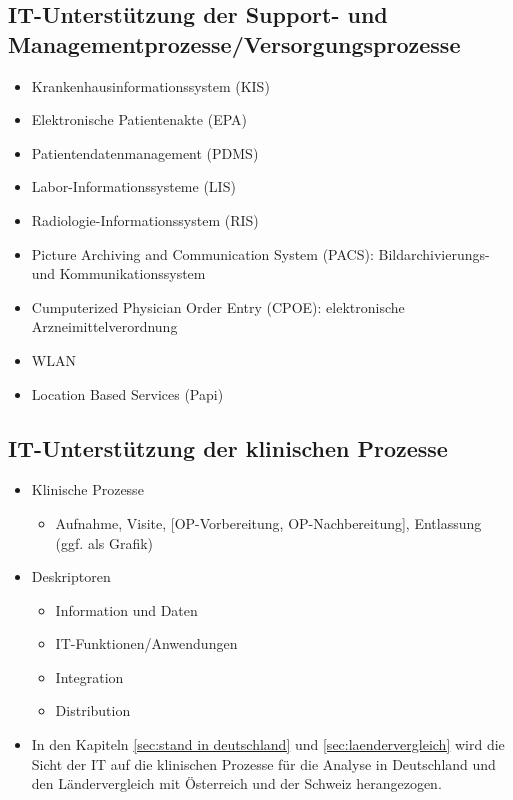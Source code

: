 	\subsection{IT-Unterstützung der Support- und Managementprozesse/Versorgungsprozesse}
	\parencite{oswald2019} \parencite[14]{braeutigam2017}
	\begin{itemize}
		\item Krankenhausinformationssystem (KIS)
		\item Elektronische Patientenakte (EPA)
		\item Patientendatenmanagement (PDMS)
		\item Labor-Informationssysteme (LIS)
		\item Radiologie-Informationssystem (RIS)
		\item Picture Archiving and Communication System (PACS): Bildarchivierungs- und Kommunikationssystem
		\item Cumputerized Physician Order Entry (CPOE): elektronische Arzneimittelverordnung
		\item WLAN
		\item Location Based Services (Papi)
	\end{itemize}
	\subsection{IT-Unterstützung der klinischen Prozesse}
		\begin{itemize}
			\item Klinische Prozesse
			\begin{itemize}
				\item Aufnahme, Visite, [OP-Vorbereitung, OP-Nachbereitung], Entlassung (ggf. als Grafik) \parencite[37]{huebner2019}
			\end{itemize}
			\item Deskriptoren
		\begin{itemize} 
			\item Information und Daten
			\item IT-Funktionen/Anwendungen
			\item Integration
			\item Distribution
		\end{itemize}
		\item In den Kapiteln \ref{sec:stand in deutschland} und \ref{sec:laendervergleich} wird die Sicht der IT auf die klinischen Prozesse für die Analyse in Deutschland und den Ländervergleich mit Österreich und der Schweiz herangezogen.
		\end{itemize}
